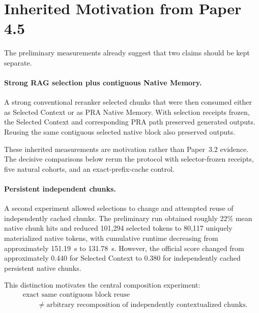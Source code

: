 \documentclass[11pt]{article}
\begin{document}
\section{Inherited Motivation from Paper 4.5}
\label{sec:prelim}

The preliminary measurements already suggest that two claims should be kept separate.

\paragraph{Strong RAG selection plus contiguous Native Memory.}
A strong conventional reranker selected chunks that were then consumed either as Selected Context or as PRA Native Memory.  With selection receipts frozen, the Selected Context and corresponding PRA path preserved generated outputs.  Reusing the same contiguous selected native block also preserved outputs.

These inherited measurements are motivation rather than Paper~3.2 evidence.
The decisive comparisons below rerun the protocol with selector-frozen receipts,
five natural cohorts, and an exact-prefix-cache control.

\paragraph{Persistent independent chunks.}
A second experiment allowed selections to change and attempted reuse of independently cached chunks.  The preliminary run obtained roughly 22\% mean native chunk hits and reduced 101,294 selected tokens to 80,117 uniquely materialized native tokens, with cumulative runtime decreasing from approximately 151.19~s to 131.78~s.  However, the official score changed from approximately 0.440 for Selected Context to 0.380 for independently cached persistent native chunks.

This distinction motivates the central composition experiment:
\[
\begin{aligned}
&\text{exact same contiguous block reuse}\\
&\qquad\neq \text{arbitrary recomposition of independently contextualized chunks}.
\end{aligned}
\]
\end{document}
